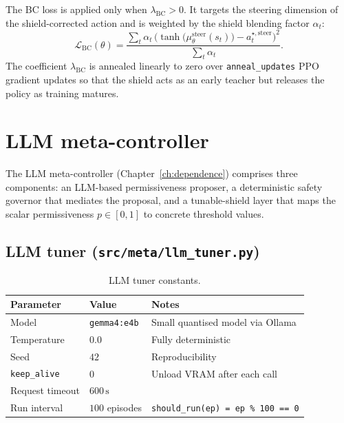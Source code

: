 The BC loss is applied only when \(\lambda_{\mathrm{BC}} > 0\).  It targets the
steering dimension of the shield-corrected action and is weighted by the shield
blending factor \(\alpha_t\):
\[
  \mathcal{L}_{\mathrm{BC}}(\theta)
  = \frac{\displaystyle\sum_t \alpha_t\,
          \bigl(\tanh\bigl(\mu^{\mathrm{steer}}_\theta(s_t)\bigr)
                - a^{\star,\mathrm{steer}}_t\bigr)^2}
         {\displaystyle\sum_t \alpha_t}.
\]
The coefficient \(\lambda_{\mathrm{BC}}\) is annealed linearly to zero over
\texttt{anneal\_updates} PPO gradient updates so that the shield acts as an
early teacher but releases the policy as training matures.

\section{LLM meta-controller}\label{app:hp-meta}

The LLM meta-controller (Chapter~\ref{ch:dependence}) comprises three components:
an LLM-based permissiveness proposer, a deterministic safety governor that
mediates the proposal, and a tunable-shield layer that maps the scalar
permissiveness \(p \in [0,1]\) to concrete threshold values.

\subsection*{LLM tuner (\texttt{src/meta/llm\_tuner.py})}

\begin{table}[H]
  \centering
  \caption{LLM tuner constants.}
  \label{tab:hp-llm}
  \small
  \begin{tabular}{@{}lll@{}}
    \toprule
    \textbf{Parameter} & \textbf{Value} & \textbf{Notes} \\
    \midrule
    Model              & \texttt{gemma4:e4b} & Small quantised model via Ollama \\
    Temperature        & \(0.0\)             & Fully deterministic \\
    Seed               & \(42\)              & Reproducibility \\
    \texttt{keep\_alive} & \(0\)             & Unload VRAM after each call \\
    Request timeout    & \(600\,\mathrm{s}\) & \\
    Run interval       & \(100\) episodes    & \texttt{should\_run(ep) = ep \% 100 == 0} \\
    \bottomrule
  \end{tabular}
\end{table}

